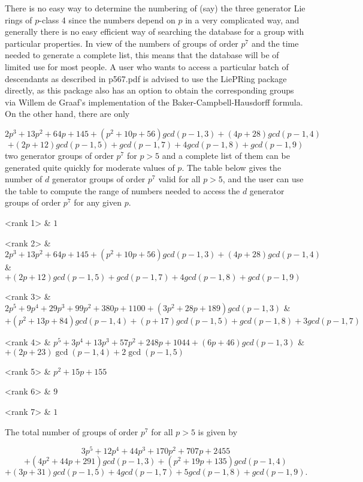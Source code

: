 There is no easy way to determine the numbering of (say) the three generator
Lie rings of $p$-class 4 since the numbers depend on $p$ in a very
complicated way, and generally there is no easy efficient way of searching
the database for a group with particular properties. In view of the numbers
of groups of order $p^{7}$ and the time needed to generate a complete list,
this means that the database will be of limited use for most people. A user
who wants to access a particular batch of descendants as described in
p567.pdf is advised to use the LiePRing package directly, as this package
also has an option to obtain the corresponding groups via Willem de Graaf's
implementation of the Baker-Campbell-Hausdorff formula. On the other hand,
there are only 

$$
2p^{3}+13p^{2}+64p+145+(p^{2}+10p+56) gcd(p-1,3)+(4p+28) gcd(p-1,4)
$$
$$
 +(2p+12) gcd(p-1,5)+ gcd(p-1,7)+4 gcd(p-1,8)+ gcd(p-1,9)
$$
two generator groups of order $p^{7}$ for $p>5$ and a complete list of them
can be generated quite quickly for moderate values of $p$. The table below
gives the number of $d$ generator groups of order $p^{7}$ valid for all 
$p>5$, and the user can use the table to compute the range of numbers needed 
to access the $d$ generator groups of order $p^{7}$ for any given $p$.

\beginitems
<rank 1> & $1$ 

<rank 2> 
    & $2p^{3}+13p^{2}+64p+145+(p^{2}+10p+56)gcd (p-1,3) +(4p+28)gcd (p-1,4)$
    & $+(2p+12)gcd (p-1,5)+gcd (p-1,7)+4gcd (p-1,8)+gcd (p-1,9)$

<rank 3> 
      & $2p^{5}+9p^{4}+29p^{3}+99p^{2}+380p+1100+(3p^{2}+28p+189)gcd (p-1,3)$
      & $+(p^{2}+13p+84)gcd (p-1,4)+(p+17)gcd (p-1,5)+gcd (p-1,8)+3gcd (p-1,7)$

<rank 4> 
      & $p^{5}+3p^{4}+13p^{3}+57p^{2}+248p+1044+(6p+46)gcd (p-1,3)$ 
      & $+(2p+23)\gcd (p-1,4)+2\gcd (p-1,5)$ 

<rank 5> & $p^{2}+15p+155$ 

<rank 6> & $9$ 

<rank 7> & $1$
\enditems

The total number of groups of order $p^{7}$ for all $p > 5$ is given by

$$
3p^{5}+12p^{4}+44p^{3}+170p^{2}+707p+2455
$$
$$
+(4p^{2}+44p+291)gcd (p-1,3)+(p^{2}+19p+135)gcd (p-1,4) 
$$
$$
+(3p+31)gcd (p-1,5)+4gcd (p-1,7)+5gcd (p-1,8)+gcd (p-1,9).
$$


